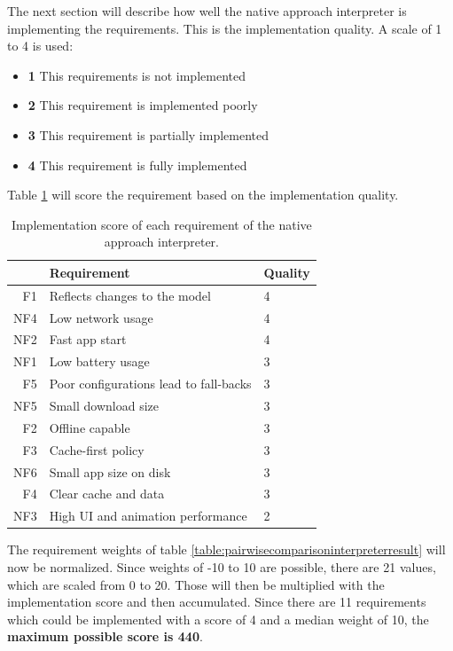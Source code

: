 The next section will describe how well the native approach interpreter is implementing the requirements.
This is the implementation quality.
A scale of 1 to 4 is used:

\begin{itemize}
	\item \textbf{1} This requirements is not implemented
	\item \textbf{2} This requirement is implemented poorly
	\item \textbf{3} This requirement is partially implemented
	\item \textbf{4} This requirement is fully implemented
\end{itemize}

Table \ref{table:implementationscorenativeapproach} will score the requirement based on the implementation quality.


\begin{table}[h]
	\begin{center}
		\begin{tabular}{r|l|l}
			& Requirement                               & Quality \\ \hline
			F1 & Reflects changes to the model                & 4     \\
			NF4 & Low network usage             & 4    \\
			NF2 & Fast app start    & 4     \\
			NF1 & Low battery usage                                   & 3     \\
			F5 & Poor configurations lead to fall-backs                     & 3     \\
			NF5 & Small download size    & 3     \\
			F2 & Offline capable                      & 3    \\
			F3 & Cache-first policy        & 3    \\
			NF6 & Small app size on disk       & 3   \\
			F4 & Clear cache and data       & 3      \\
			NF3 & High UI and animation performance         & 2 
			\\ \hline
		\end{tabular}
	\end{center}
	\caption{Implementation score of each requirement of the native approach interpreter.}
	\label{table:implementationscorenativeapproach}
\end{table}

The requirement weights of table \ref{table:pairwisecomparisoninterpreterresult} will now be normalized. 
Since weights of -10 to 10 are possible, there are 21 values, which are scaled from 0 to 20.
Those will then be multiplied with the implementation score and then accumulated.
Since there are 11 requirements which could be implemented with a score of 4 and a median weight of 10, the \textbf{maximum possible score is 440}.

